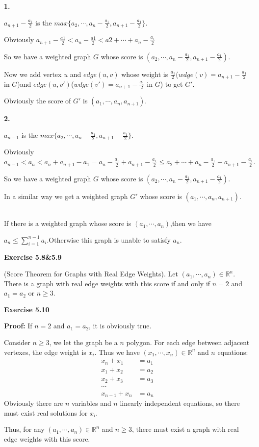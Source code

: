 \documentclass{article} %
\begin{document}
        \textbf{1.}\par
        $a_{n+1}-\frac{a_1}{2}$ is the $max\{a_2,\cdots,a_n-\frac{a_1}{2},a_{n+1}-\frac{a_1}{2}\}$.\par
        Obviously $a_{n+1}-\frac{a1}{2}<a_n-\frac{a1}{2}<a2+\cdots+a_n-\frac{a_1}{2}$\par
        So we have a weighted graph $G$ whose score is $(a_2,\cdots,a_n-\frac{a_1}{2},a_{n+1}-\frac{a_1}{2})$.\par
        Now we add vertex $u$ and $edge(u,v)$ whose weight is $\frac{a_1}{2}$($wdge(v)=a_{n+1}-\frac{a_1}{2}$ in $G$)and $edge(u,v\prime)$($wdge(v\prime)=a_{n+1}-\frac{a_1}{2}$ in $G$) to get $G\prime$.\par
        Obviously the score of $G\prime$ is $(a_1,\cdots,a_n,a_{n+1})$.\par

        \textbf{2.}\par
        $a_{n-1}$ is the $max\{a_2,\cdots,a_n-\frac{a_1}{2},a_{n+1}-\frac{a_1}{2}\}$.\par
        Obviously $a_{n-1}<a_n<a_n+a_{n+1}-a_1=a_n-\frac{a_1}{2}+a_{n+1}-\frac{a_1}{2}\leq a_2+\cdots+a_n-\frac{a_1}{2}+a_{n+1}-\frac{a_1}{2}.$\par
        So we have a weighted graph $G$ whose score is $(a_2,\cdots,a_n-\frac{a_1}{2},a_{n+1}-\frac{a_1}{2})$.\par
        In a similar way we get a weighted graph $G\prime$ whose score is $(a_1,\cdots,a_n,a_{n+1})$.\par
        ~\\
        If there is a weighted graph whose score is $(a_1,\cdots,a_n)$,then we have\par
        $a_n\leq\sum_{i=1}^{n-1}a_i.$Otherwise this graph is unable to satisfy $a_n$.
        

	
	

\textbf{Exercise 5.8\&5.9}\par
	(Score Theorem for Graphs with Real Edge Weights). Let $(a_1,\cdots, a_n)\in\mathbb{R}^n$. 
	There is a graph with real edge weights with this score if and only if $n=2$ and $a_1=a_2$ or $n\ge 3$.
	 
\textbf{Exercise 5.10}\par
	\textbf{Proof:}
	If $n=2$ and $a_1=a_2$, it is obviously true.\par
	Consider $n\ge 3$, we let the graph be a $n$ polygon. For each edge between adjacent vertexes, the edge weight is $x_i$. 
	Thus we have $(x_1,\cdots, x_n)\in\mathbb{R}^n$ and  $n$ equations:
	\begin{align*}
	x_{n}+x_1&=a_1\\
	x_1+x_2&=a_2\\
	x_2+x_3&=a_3\\
	\cdots\\
	x_{n-1}+x_{n}&=a_{n}
	\end{align*}
	Obviously there are $n$ variables and $n$ linearly independent equations, so there must exist real solutions for $x_i$.\par
	Thus, for any $(a_1,\cdots, a_n)\in\mathbb{R}^n$ and $n\ge 3$, there must exist a graph with real edge weights with this score.
\end{document}
